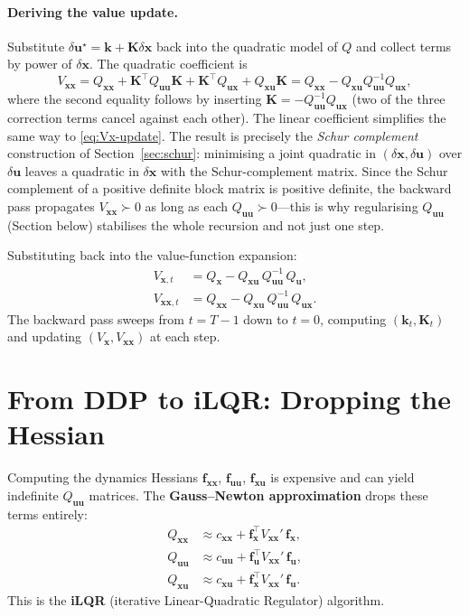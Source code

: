 \documentclass[11pt,twoside]{report}
\theoremstyle{definition}
\theoremstyle{plain}
\theoremstyle{remark}
\newcommand{\x}{\bm{x}}
\newcommand{\uu}{\bm{u}}
\newcommand{\f}{\bm{f}}
\newcommand{\0}{\bm{0}}
\begin{document}
\paragraph{Deriving the value update.}
Substitute $\delta\uu^{\star}=\bm{k}+\bm{K}\delta\x$ back into the
quadratic model of $Q$ and collect terms by power of $\delta\x$.
The quadratic coefficient is
\begin{equation*}
V_{\x\x}=Q_{\x\x}+\bm{K}^{\!\top}Q_{\uu\uu}\bm{K}
+\bm{K}^{\!\top}Q_{\uu\x}+Q_{\x\uu}\bm{K}
=Q_{\x\x}-Q_{\x\uu}Q_{\uu\uu}^{-1}Q_{\uu\x},
\end{equation*}
where the second equality follows by inserting
$\bm{K}=-Q_{\uu\uu}^{-1}Q_{\uu\x}$ (two of the three correction terms
cancel against each other). The linear coefficient simplifies the same
way to \eqref{eq:Vx-update}. The result is precisely the
\emph{Schur complement} construction of Section~\ref{sec:schur}:
minimising a joint quadratic in $(\delta\x,\delta\uu)$ over
$\delta\uu$ leaves a quadratic in $\delta\x$ with the Schur-complement
matrix. Since the Schur complement of a positive definite block matrix
is positive definite, the backward pass propagates
$V_{\x\x}\succ 0$ as long as each $Q_{\uu\uu}\succ 0$---this is why
regularising $Q_{\uu\uu}$ (Section below) stabilises the whole
recursion and not just one step.

Substituting back into the value-function expansion:
\begin{align}
V_{\x,t}&=Q_{\x}-Q_{\x\uu}\,Q_{\uu\uu}^{-1}\,Q_{\uu},\label{eq:Vx-update}\\
V_{\x\x,t}&=Q_{\x\x}-Q_{\x\uu}\,Q_{\uu\uu}^{-1}\,Q_{\uu\x}.\label{eq:Vxx-update}
\end{align}
The backward pass sweeps from $t=T{-}1$ down to $t=0$, computing
$(\bm{k}_{t},\bm{K}_{t})$ and updating $(V_{\x},V_{\x\x})$ at each step.

\section{From DDP to iLQR: Dropping the Hessian}
\label{sec:ilqr}

\begin{warningbox}
Computing the dynamics Hessians $\f_{\x\x}$, $\f_{\uu\uu}$, $\f_{\x\uu}$
is expensive and can yield indefinite $Q_{\uu\uu}$ matrices.
The \textbf{Gauss--Newton approximation} drops these terms entirely:
\begin{align}
Q_{\x\x}&\approx c_{\x\x}+\f_{\x}^{\!\top}V_{\x\x}'\,\f_{\x},\label{eq:Qxx-ilqr}\\
Q_{\uu\uu}&\approx c_{\uu\uu}+\f_{\uu}^{\!\top}V_{\x\x}'\,\f_{\uu},\label{eq:Quu-ilqr}\\
Q_{\x\uu}&\approx c_{\x\uu}+\f_{\x}^{\!\top}V_{\x\x}'\,\f_{\uu}.\label{eq:Qxu-ilqr}
\end{align}
This is the \textbf{iLQR} (iterative Linear-Quadratic Regulator) algorithm.
\end{warningbox}
\end{document}
